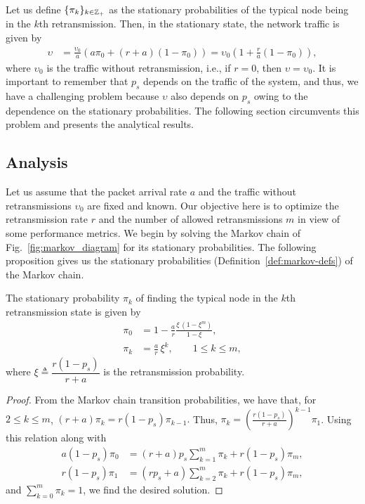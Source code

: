 Let us define $\{\pi_k\}_{k\in{\mathbb Z}_+}$ as the stationary probabilities of the typical node being in the $k$th retransmission.
%
Then, in the stationary state, the network traffic is given by%
\begin{align} \label{eq:traffic_ret}
    \upsilon &= \frac{\upsilon_0}{a} \left( a \pi_0 + (r+a) (1-\pi_0) \right) = \upsilon_0 \left( 1 + \frac{r}{a} (1 - \pi_0) \right),
\end{align}
where $\upsilon_0$ is the traffic without retransmission, i.e., if $r=0$, then $\upsilon=\upsilon_0$.
%
It is important to remember that $p_s$ depends on the traffic of the system, and thus, we have a challenging problem because $\upsilon$ also depends on $p_s$ owing to the dependence on the stationary probabilities. %
The following section circumvents this problem and presents the analytical results.

\subsection{Analysis}

Let us assume that the packet arrival rate $a$ and the traffic without retransmissions $\upsilon_0$ are fixed and known.
%
Our objective here is to optimize the retransmission rate $r$ and the number of allowed retransmissions $m$ in view of some performance metrics.
%
We begin by solving the Markov chain of Fig.~\ref{fig:markov_diagram} for its stationary probabilities.
%
The following proposition gives us the stationary probabilities (Definition~\ref{def:markov-defs}) of the Markov chain.

\begin{proposition} \label{prop:pi}
    The stationary probability $\pi_k$ of finding the typical node in the $k$th retransmission state is given by
    \begin{align*}
        \pi_0 &= 1 - \frac{a}{r} \frac{\xi\,(1-\xi^m)}{1-\xi},\\
        \pi_k &= \frac{a}{r}\,\xi^k, \qquad 1\le k\le m,
    \end{align*}
    where $\xi \triangleq \dfrac{r(1-p_s)}{r+a}$ is the retransmission probability.
\end{proposition}

\begin{proof}
    From the Markov chain transition probabilities, we have that, for $2\le k\le m$,
    $
        (r+a)\pi_k = r (1-p_s) \pi_{k-1}.
    $
    Thus, $\pi_k = \left(\frac{r(1-p_s)}{r+a}\right)^{k-1}\pi_1$.
    Using this relation along with
    \begin{align*}
        a(1-p_s)\pi_0 &= (r+a)p_s\sum_{k=1}^m\pi_k + r(1-p_s) \pi_m,\\
        r(1-p_s)\pi_1 &= (r p_s+a)\sum_{k=2}^m\pi_k + r(1-p_s) \pi_m,
    \end{align*}
    and $\sum_{k=0}^m \pi_k = 1$, we find the desired solution.
\end{proof}

